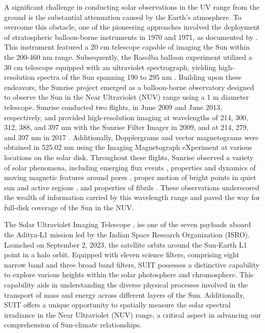 {A significant challenge in conducting solar observations in the UV range from the ground is the substantial attenuation caused by the Earth's atmosphere. To overcome this obstacle, one of the pioneering approaches involved the deployment of stratospheric balloon-borne instruments in 1970 and 1971, as documented by \cite{herse79}. This instrument featured a 20 cm telescope capable of imaging the Sun within the 200-460 nm range. Subsequently, the Rasolba balloon experiment utilized a 30 cm telescope equipped with an ultraviolet spectrograph, yielding high-resolution spectra of the Sun spanning 190 to 295 nm \citep{samain85,staath95}. Building upon these endeavors, the Sunrise project \citep{sunrise1,sunrise2} emerged as a balloon-borne observatory designed to observe the Sun in the Near Ultraviolet (NUV) range using a 1 m diameter telescope. Sunrise conducted two flights, in June 2009 and June 2013, respectively, and provided high-resolution imaging at wavelengths of 214, 300, 312, 388, and 397 nm with the Sunrise Filter Imager \citep[SuFI,][]{sufi} in 2009, and at 214, 279, and 397 nm in 2017 \citep{sunrise2}. Additionally, Dopplergrams and vector magnetograms were obtained in  525.02 nm using the Imaging Magnetograph eXperiment \citep[IMaX,][]{imax} at various locations on the solar disk. Throughout these flights, Sunrise observed a variety of solar phenomena, including emerging flux events \citep{centeno17}, properties and dynamics of moving magnetic features around pores \citep{kaithakkal17}, proper motion of bright points in quiet sun and active regions \citep{jafarzadeh17}, and properties of fibrils \citep{gaferia17}. These observations underscored the wealth of information carried by this wavelength range and paved the way for full-disk coverage of the Sun in the NUV.

The Solar Ultraviolet Imaging Telescope \citep[SUIT;][]{ghosh16,article}, iss one of the seven payloads aboard the Aditya-L1 mission \citep{adityal1, aditya} led by the Indian Space Research Organization (ISRO). Launched on September 2, 2023, the satellite orbits around the Sun-Earth L1 point in a halo orbit. Equipped with eleven science filters, comprising eight narrow band and three broad band filters, SUIT possesses a distinctive capability to explore various heights within the solar photosphere and chromosphere. This capability aids in understanding the diverse physical processes involved in the transport of mass and energy across different layers of the Sun. Additionally, SUIT offers a unique opportunity to spatially measure the solar spectral irradiance in the Near Ultraviolet (NUV) range, a critical aspect in advancing our comprehension of Sun-climate relationships.

}
